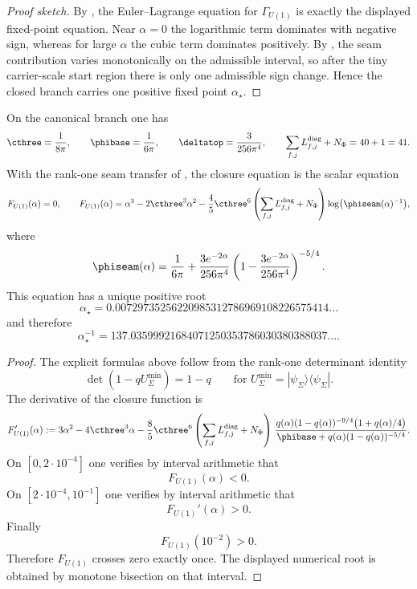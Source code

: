 \begin{proof}[Proof sketch]
By , the Euler--Lagrange equation for
$\Gamma_{U(1)}$ is exactly the displayed fixed-point equation. Near $\alpha=0$ the logarithmic term
dominates with negative sign, whereas for large $\alpha$ the cubic term dominates positively. By
, the seam contribution varies monotonically on the admissible interval, so
after the tiny carrier-scale start region there is only one admissible sign change. Hence the
closed branch carries one positive fixed point $\alpha_\star$.
\end{proof}

\fi

\begin{theorem}
\label{thm:exact-electromagnetic-closure}
\label{thm:alpha-canonical}
On the canonical branch one has
\[
\cthree=\frac{1}{8\pi},
\qquad
\phibase=\frac{1}{6\pi},
\qquad
\deltatop=\frac{3}{256\pi^4},
\qquad
\sum_{f,j}L_{f,j}^{\mathrm{diag}}+N_\Phi=40+1=41.
\]
With the rank-one seam transfer of , the closure equation
is the scalar equation
\begin{equation}
\label{eq:carrier-cfe}
F_{U(1)}(\alpha)=0,
\qquad
F_{U(1)}(\alpha)=\alpha^3-2\cthree^3\alpha^2-\frac45\cthree^6
\left(\sum_{f,j}L_{f,j}^{\mathrm{diag}}+N_\Phi\right)\log\bigl(\phiseam(\alpha)^{-1}\bigr),
\end{equation}
where
\[
\phiseam(\alpha)=\frac{1}{6\pi}+\frac{3e^{-2\alpha}}{256\pi^4}
\left(1-\frac{3e^{-2\alpha}}{256\pi^4}\right)^{-5/4}.
\]
This equation has a unique positive root
\[
\alpha_{\star}=0.00729735256220985312786969108226575414\dots
\]
and therefore
\[
\alpha_{\star}^{-1}=137.03599921684071250353786030380388037\dots.
\]
\end{theorem}

\begin{proof}
The explicit formulas above follow from the rank-one determinant identity
\[
\det(1-qU_{\Sigma}^{\min})=1-q
\qquad
\text{for } U_{\Sigma}^{\min}=|\psi_{\Sigma}\rangle\langle\psi_{\Sigma}|.
\]
The derivative of the closure function is
\[
F_{U(1)}'(\alpha)
:=
3\alpha^2-4\cthree^3\alpha
-\frac85\cthree^6\left(\sum_{f,j}L_{f,j}^{\mathrm{diag}}+N_\Phi\right)\,
\frac{q(\alpha)(1-q(\alpha))^{-9/4}\bigl(1+q(\alpha)/4\bigr)}
{\phibase+q(\alpha)(1-q(\alpha))^{-5/4}}.
\]
On $[0,2\cdot 10^{-4}]$ one verifies by interval arithmetic that
\[
F_{U(1)}(\alpha)<0.
\]
On $[2\cdot 10^{-4},10^{-1}]$ one verifies by interval arithmetic that
\[
F_{U(1)}'(\alpha)>0.
\]
Finally
\[
F_{U(1)}(10^{-2})>0.
\]
Therefore $F_{U(1)}$ crosses zero exactly once. The displayed numerical root is obtained by
monotone bisection on that interval.
\end{proof}

